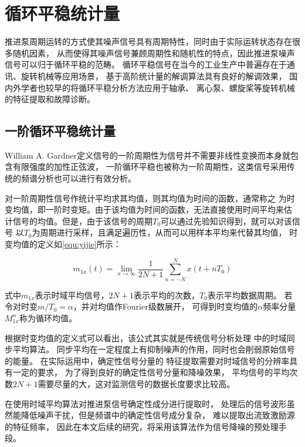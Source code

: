 \section{循环平稳统计量}
推进泵周期运转的方式使其噪声信号具有周期特性，同时由于实际运转状态存在很多随机因素，
从而使得其噪声信号兼顾周期性和随机性的特点，因此推进泵噪声信号可以归于循环平稳的范畴。
循环平稳信号在当今的工业生产中普遍存在于通讯、旋转机械等应用场景，
基于高阶统计量的解调算法具有良好的解调效果，
国内外学者也较早的将循环平稳分析方法应用于轴承、
离心泵、螺旋桨等旋转机械的特征提取和故障诊断。
\subsection{一阶循环平稳统计量}
William A. Gardner定义信号的一阶周期性为信号并不需要非线性变换而本身就包含有限强度的加性正弦波，
一阶循环平稳也被称为一阶周期性，这类信号采用传统的频谱分析也可以进行有效分析。

对一阶周期性信号作统计平均求其均值，则其均值为时间的函数，通常称之
为时变均值，即一阶时变矩。由于该均值为时间的函数，无法直接使用时间平均来估
计信号的均值。但是，由于该信号的周期$T_{0}$可以通过先验知识得到，就可以对该信号
以$T_{0}$为周期进行采样，且满足遍历性，从而可以用样本平均来代替其均值，
时变均值的定义如\autoref{equ:yijie}所示：

\begin{equation}
    \label{equ:yijie}
    m_{1x} \left ( t \right ) =\lim_{x \to \infty} \frac{1}{2N+1}\sum_{n=-N}^{N}x\left ( t+nT_{0}  \right )   
\end{equation}

式中$m_{1x}$表示时域平均信号，$2N+1$表示平均的次数，$T_{0}$表示平均数据周期。
若令对时变$m/T_{0} =\alpha$，并对均值作Fourier级数展开，
可得到时变均值的$\alpha$频率分量$M_{1x}^{\alpha}$称为循环均值。

根据时变均值的定义式可以看出，该公式其实就是传统信号分析处理
中的时域同步平均算法。
同步平均在一定程度上有抑制噪声的作用，同时也会削弱原始信号的能量。
在实际运用中，确定性信号分量的
特征提取需要对时域信号的分辨率具有一定的要求，
为了得到良好的确定性信号分量和降噪效果，
平均信号的平均次数$2N+1$需要尽量的大，这对监测信号的数据长度要求比较高。

在使用时域平均算法对推进泵信号确定性成分进行提取时，
处理后的信号波形虽然能降低噪声干扰，但是频谱中的确定性信号成分复杂，
难以提取出流致激励源的特征频率，
因此在本文后续的研究，将采用该算法作为信号降噪的预处理手段。

